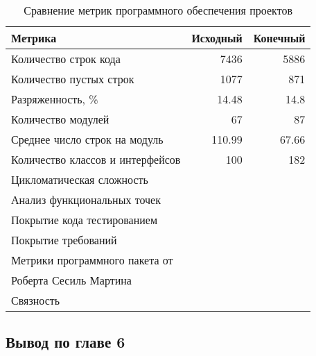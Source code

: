     \begin{table}[H]
        \caption{Сравнение метрик программного обеспечения проектов}
        \begin{center}
            \begin{tabular}{l|r|r}
                \textbf{Метрика} & \textbf{Исходный} & \textbf{Конечный} \\
                \hline
                Количество строк кода               & 7436 & 5886 \\
                Количество пустых строк             & 1077 & 871 \\
                Разряженность, \%                   & 14.48 & 14.8 \\
                Количество модулей                  & 67 & 87 \\
                Среднее число строк на модуль       & 110.99 & 67.66 \\
                Количество классов и интерфейсов    & 100 & 182 \\
                Цикломатическая сложность           & & \\
                Анализ функциональных точек         & & \\
                Покрытие кода тестированием         & & \\
                Покрытие требований                 & & \\
                Метрики программного пакета от      & & \\
                Роберта Сесиль Мартина              & & \\
                Связность                           & & \\
            \end{tabular}
        \end{center}
    \end{table}

    \subsection*{Вывод по главе 6}
